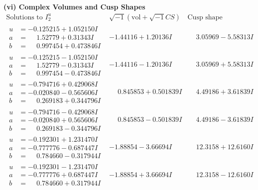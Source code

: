 \documentclass[1p]{elsarticle_modified}
\theoremstyle{definition}
\newcommand{\I}{\sqrt{-1}}
\begin{document}
\newpage\flushleft \textbf{(vi) Complex Volumes and Cusp Shapes}
$$\begin{array}{c|c|c}  
\text{Solutions to }I^u_{2}& \I (\text{vol} + \sqrt{-1}CS) & \text{Cusp shape}\\
 \hline 
\begin{aligned}
u &= -0.125215 + 1.052150 I \\
a &= \phantom{-}1.52779 + 0.31343 I \\
b &= \phantom{-}0.997454 + 0.473846 I\end{aligned}
 & -1.44116 + 1.20136 I & \phantom{-}3.05969 - 5.58313 I \\ \hline\begin{aligned}
u &= -0.125215 - 1.052150 I \\
a &= \phantom{-}1.52779 - 0.31343 I \\
b &= \phantom{-}0.997454 - 0.473846 I\end{aligned}
 & -1.44116 - 1.20136 I & \phantom{-}3.05969 + 5.58313 I \\ \hline\begin{aligned}
u &= -0.794716 + 0.429068 I \\
a &= -0.020840 - 0.565606 I \\
b &= \phantom{-}0.269183 + 0.344796 I\end{aligned}
 & \phantom{-}0.845853 + 0.501839 I & \phantom{-}4.49186 + 3.61839 I \\ \hline\begin{aligned}
u &= -0.794716 - 0.429068 I \\
a &= -0.020840 + 0.565606 I \\
b &= \phantom{-}0.269183 - 0.344796 I\end{aligned}
 & \phantom{-}0.845853 - 0.501839 I & \phantom{-}4.49186 - 3.61839 I \\ \hline\begin{aligned}
u &= -0.192301 + 1.231470 I \\
a &= -0.777776 - 0.687447 I \\
b &= \phantom{-}0.784660 - 0.317944 I\end{aligned}
 & -1.88854 - 3.66694 I & \phantom{-}12.3158 + 12.6160 I \\ \hline\begin{aligned}
u &= -0.192301 - 1.231470 I \\
a &= -0.777776 + 0.687447 I \\
b &= \phantom{-}0.784660 + 0.317944 I\end{aligned}
 & -1.88854 + 3.66694 I & \phantom{-}12.3158 - 12.6160 I \\ \hline\begin{aligned}

\end{aligned}
\end{array}$$
\end{document}
